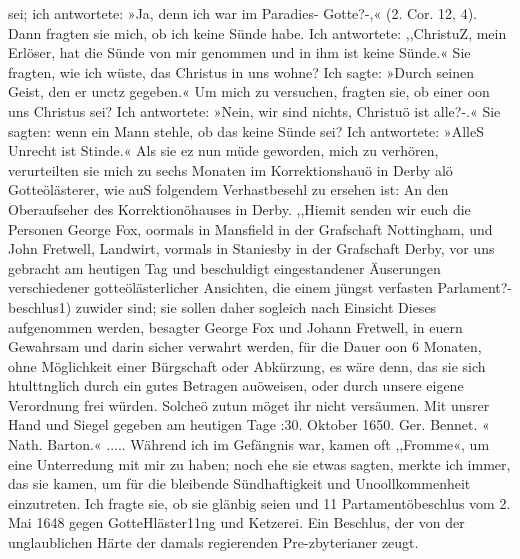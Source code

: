 sei; ich antwortete: »Ja, denn ich war im Paradies- Gotte?-,«
(2. Cor. 12, 4). Dann fragten sie mich, ob ich keine Sünde habe.
Ich antwortete: ,,ChristuZ, mein Erlöser, hat die Sünde von mir
genommen und in ihm ist keine Sünde.« Sie fragten, wie ich
wüste, das Christus in uns wohne? Ich sagte: »Durch seinen
Geist, den er unctz gegeben.« Um mich zu versuchen, fragten sie,
ob einer oon uns Christus sei? Ich antwortete: »Nein, wir
sind nichts, Christuö ist alle?-.« Sie sagten: wenn ein Mann
stehle, ob das keine Sünde sei? Ich antwortete: »AlleS Unrecht
ist Stinde.« Als sie ez nun müde geworden, mich zu verhören,
verurteilten sie mich zu sechs Monaten im Korrektionshauö in
Derby alö Gotteölästerer, wie auS folgendem Verhastbesehl zu
ersehen ist:
An den Oberaufseher des Korrektionöhauses in Derby.
,,Hiemit senden wir euch die Personen George Fox, oormals
in Mansfield in der Grafschaft Nottingham, und John Fretwell,
Landwirt, vormals in Staniesby in der Grafschaft Derby, vor
uns gebracht am heutigen Tag und beschuldigt eingestandener
Äuserungen verschiedener gotteölästerlicher Ansichten, die einem
jüngst verfasten Parlament?-beschlus1) zuwider sind; sie sollen daher
sogleich nach Einsicht Dieses aufgenommen werden, besagter
George Fox und Johann Fretwell, in euern Gewahrsam und
darin sicher verwahrt werden, für die Dauer oon 6 Monaten,
ohne Möglichkeit einer Bürgschaft oder Abkürzung, es wäre denn,
das sie sich htulttnglich durch ein gutes Betragen auöweisen, oder
durch unsere eigene Verordnung frei würden. Solcheö zutun
möget ihr nicht versäumen.
Mit unsrer Hand und Siegel gegeben am heutigen Tage
:30. Oktober 1650. Ger. Bennet. «
Nath. Barton.« .....
Während ich im Gefängnis war, kamen oft ,,Fromme«, um eine
Unterredung mit mir zu haben; noch ehe sie etwas sagten, merkte
ich immer, das sie kamen, um für die bleibende Sündhaftigkeit und
Unoollkommenheit einzutreten. Ich fragte sie, ob sie glänbig seien und
11 Partamentöbeschlus vom 2. Mai 1648 gegen GotteHläster11ng und
Ketzerei. Ein Beschlus, der von der unglaublichen Härte der damals regierenden
Pre-zbyterianer zeugt.


